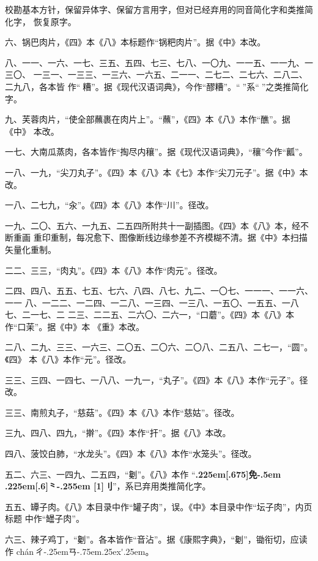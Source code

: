 校勘基本方针，保留异体字、保留方言用字，但对已经弃用的同音简化字和类推简化字，
恢复原字。

\vspace{1\baselineskip}

六、锅巴肉片，《四》本《八》本标题作“锅粑肉片”。据《中》本改。

八、一一、一六、一七、三五、五四、七三、七八、一〇九、一一五、一一九、一三〇、
一三一、一三三、一三六、一六五、二一一、二七二、二七六、二八二、二九八，各本皆
作“𰪿糟”。据《现代汉语词典》，今作“醪糟”。“𰪿”系“𫃑”之类推简化字。

九、芙蓉肉片，“使全部蘸裹在肉片上”。“蘸”，《四》本《八》本作“醮”。据《中》
本改。

一七、大南瓜蒸肉，各本皆作“掏尽内穰”。据《现代汉语词典》，“穰”今作“瓤”。

一八、一九，“尖刀丸子”。《四》本《八》本《七》本作“尖刀元子”。据《中》本改。

一八、二七九，“汆”。《四》本《八》本作“川”。径改。

一九、二〇、五六、一九五、二五四所附共十一副插图。《四》本《八》本，经不断重画
重印重制，每况愈下、图像断线边缘参差不齐模糊不清。据《中》本扫描矢量化重制。

二二、三三，“肉丸”。《四》本《八》本作“肉元”。径改。

二四、四八、五五、七五、七六、八四、八七、九二、一〇七、一一一、一一六、一一
八、一二二、一二四、一二八、一三四、一三八、一五〇、一五五、一八七、二一七、二
二三、二二五、二六〇、二六一，“口蘑”。《四》本《八》本作“口茉”。据《中》本
《重》本改。

二八、二九、三三、一六三、二〇五、二〇六、二〇八、二五八、二七一，“圆”。《四》
本《八》本作“元”。径改。

三三、三四、一四七、一八八、一九一，“丸子”。《四》本《八》本作“元子”。径改。

三三、南煎丸子，“慈菇”。《四》本《八》本作“慈姑”。径改。

三九、四八、四九，“擀”。《四》本作“扞”。据《八》本改。

四八、菠饺白肺，“水龙头”。《四》本《八》本作“水笼头”。径改。

五二、六三、一四九、二五四，“劖”。《八》本作
“{\bfseries\raise.225em\hbox{\scalebox{.6}[.675]{免}}\kern-.5em%
\lower.225em\hbox{\scalebox{.6}[.6]{⺀}}\kern-.255em%
\scalebox{.6}[1]{刂}}”，系已弃用类推简化字。

五五、罈子肉。《八》本目录中作“罐子肉”，误。《中》本目录中作“坛子肉”，内页标题
中作“罎子肉”。

六三、辣子鸡丁，“劖”。各本皆作“音沾”。据《康熙字典》，“劖”，锄衔切，应读作
{ch\'{a}n}\,{ㄔ\kern-.25emㄢ\kern-.75em\raise.25ex\hbox{\'{}}\kern.25em}。

